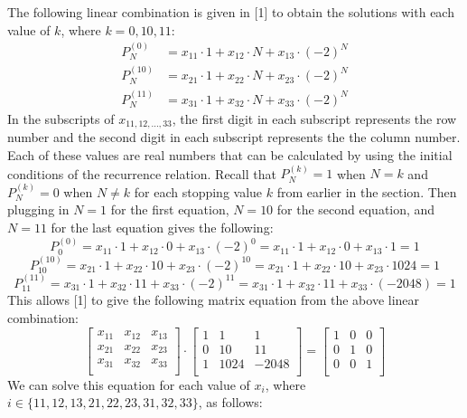 \documentclass[12pt]{article}
\begin{document}
The following linear combination is given in [1] to obtain the solutions with each value of $k$, where $k = 0,10,11$:
\begin{align}
    P^{(0)}_N &= x_{11} \cdot 1 + x_{12} \cdot N + x_{13} \cdot (-2)^N \\
    P^{(10)}_N &= x_{21} \cdot 1 + x_{22} \cdot N + x_{23} \cdot (-2)^N \\
    P^{(11)}_N &= x_{31} \cdot 1 + x_{32} \cdot N + x_{33} \cdot (-2)^N
\end{align}
In the subscripts of $x_{11, 12, ..., 33}$, the first digit in each subscript represents the row number and the second digit in each subscript represents the the column number.
Each of these values are real numbers that can be calculated by using the initial conditions of the recurrence relation.
\newline
Recall that $P_{N}^{(k)} = 1$ when $N = k$ and $P_{N}^{(k)} = 0$ when $N \neq k$ for each stopping value $k$ from earlier in the section.  
Then plugging in $N = 1$ for the first equation, $N = 10$ for the second equation, and $N = 11$ for the last equation gives the following:
$$P^{(0)}_{0} = x_{11} \cdot 1 + x_{12} \cdot 0 + x_{13} \cdot (-2)^{0}
= x_{11} \cdot 1 + x_{12} \cdot 0 + x_{13} \cdot 1
= 1$$
$$P^{(10)}_{10} = x_{21} \cdot 1 + x_{22} \cdot 10 + x_{23} \cdot (-2)^{10}
= x_{21} \cdot 1 + x_{22} \cdot 10 + x_{23} \cdot 1024
= 1$$
$$P^{(11)}_{11} = x_{31} \cdot 1 + x_{32} \cdot 11 + x_{33} \cdot (-2)^{11} 
= x_{31} \cdot 1 + x_{32} \cdot 11 + x_{33} \cdot (-2048)
= 1$$
This allows [1] to give the following matrix equation from the above linear combination:
$$
\begin{bmatrix}
x_{11} & x_{12} & x_{13} \\
x_{21} & x_{22} & x_{23} \\
x_{31} & x_{32} & x_{33} \\
\end{bmatrix}
\cdot
\begin{bmatrix}
1 & 1 & 1 \\
0 & 10 & 11 \\
1 & 1024 & -2048 \\
\end{bmatrix}
=
\begin{bmatrix}
1 & 0 & 0 \\
0 & 1 & 0 \\
0 & 0 & 1 \\
\end{bmatrix}
$$
We can solve this equation for each value of $x_{i}$, where $i\in\{11,12,13,21,22,23,31,32,33\}$, as follows:
\end{document}
